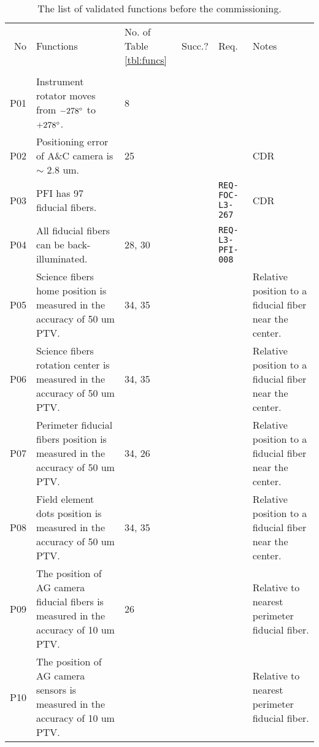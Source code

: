 

\begin{landscape}
\begin{longtable}{r|p{80mm}|p{25mm}|c|p{30mm}|p{45mm}}
\caption{
The list of validated functions before the commissioning.}
\label{tbl:subfuncs} 
\footnotesize
\\ \hline
No	& Functions & No. of Table \ref{tbl:funcs} & Succ.?  & Req.	& Notes \\ \hline \hline
\endhead
\endfoot
\multicolumn{6}{l}{\hspace{5mm} {\bf PFI (including Cable C)}} \\ \hline
P01	& Instrument rotator moves from $-278 ^\circ$ to $+278 ^\circ$.	& 8	&	&	& \\ \hline
P02	& Positioning error of A\&C camera is $\sim$ 2.8 um.	& 25	&	&	& CDR \\ \hline
P03 & PFI has 97 fiducial fibers.	&	& 	& {\tt REQ-FOC-L3-267}	& CDR \\ \hline 
P04 & All fiducial fibers can be back-illuminated.	&  28, 30	& 	& {\tt REQ-L3-PFI-008}	& \\ \hline
P05 & Science fibers home position is measured in the accuracy of 50 um PTV.	& 34, 35	& 	&	& Relative position to a fiducial fiber near the center. \\ \hline
P06 & Science fibers rotation center is measured in the accuracy of 50 um PTV.	& 34, 35	& 	&	& Relative position to a fiducial fiber near the center. \\ \hline
P07 & Perimeter fiducial fibers position is measured in the accuracy of 50 um PTV.	& 34, 26	& 	&	& Relative position to a fiducial fiber near the center. \\ \hline
P08 & Field element dots position is measured in the accuracy of 50 um PTV.	& 34, 35	& 	&	& Relative position to a fiducial fiber near the center. \\ \hline
P09 & The position of AG camera fiducial fibers is measured in the accuracy of 10 um PTV.	& 26	& 	&	& Relative to nearest perimeter fiducial fiber. \\ \hline
P10 & The position of AG camera sensors is measured in the accuracy of 10 um PTV.	& 	& 	&	& Relative to nearest perimeter fiducial fiber. \\ \hline

\end{longtable}
\end{landscape}
